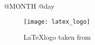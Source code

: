 \documentclass[11pt,a4paper]{article}
\begin{document}
{\Huge @MONTH @day}

\begin{figure}[h!]
    \texttt{[image: latex\_logo]}
    \caption{\LaTeX logo taken from \cite{wikipedia}}
\end{figure}



\printbibliography{}
\end{document}
